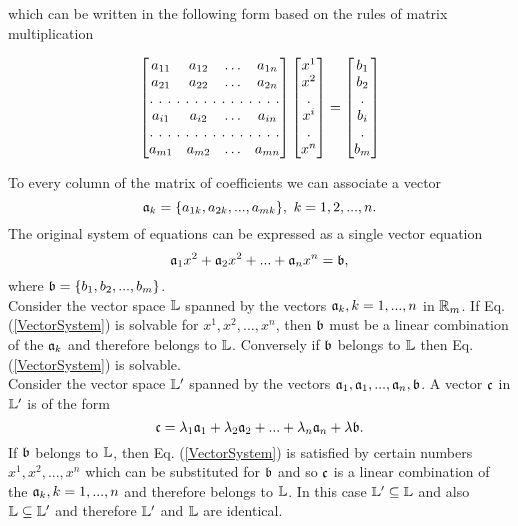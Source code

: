 which can be written in the following form based on the rules of matrix multiplication

\begin{equation}
\begin{bmatrix}
a_{11} & a_{12}  & \hdots & a_{1n}  \\
a_{21} & a_{22}  & \hdots & a_{2n}  \\
\hdotsfor[2]{4}\\
a_{i1} & a_{i2}  & \hdots & a_{in}  \\
\hdotsfor[2]{4}\\
a_{m1} & a_{m2}  & \hdots & a_{mn}  \\
\end{bmatrix}
\begin{bmatrix}
x^1\\
x^2\\
.\\
x^i\\
.\\
x^n\\
\end{bmatrix}
=
\begin{bmatrix}
b_1\\
b_2\\
.\\
b_i\\
.\\
b_m\\
\end{bmatrix}
\label{MatrixSystem}
\end{equation}

To every column of the matrix of coefficients we can associate a vector
$$\mathfrak{a}_k = \{a_{1k}, a_{2k},...,a_{mk}\}, ~k = 1,2,...,n.$$
The original system of equations can be expressed as a single vector equation
\begin{equation}\mathfrak{a}_1 x^2 + \mathfrak{a}_2 x^2 + ... + \mathfrak{a}_n x^n = \mathfrak{b},\label{VectorSystem}\end{equation} where $\mathfrak{b} = \{b_1, b_2, ..., b_m\}$. \\

Consider the vector space $\mathbb{L}$ spanned by the vectors $\mathfrak{a}_k, k = 1,...,n$ in $\mathbb{R}_m$. If Eq.(\ref{VectorSystem}) is solvable for $x^1, x^2, ..., x^n$, then $\mathfrak{b}$ must be a linear combination of the $\mathfrak{a}_k$ and therefore belongs to $\mathbb{L}$. Conversely if $\mathfrak{b}$ belongs to $\mathbb{L}$ then Eq.(\ref{VectorSystem}) is solvable. \\

Consider the vector space $\mathbb{L}'$ spanned by the vectors $\mathfrak{a}_1, \mathfrak{a}_1, ..., \mathfrak{a}_n, \mathfrak{b}$. A vector $\mathfrak{c}$ in $\mathbb{L}'$ is of the form 
$$\mathfrak{c} = \lambda_1 \mathfrak{a}_1 + \lambda_2 \mathfrak{a}_2 + ... + \lambda_n \mathfrak{a}_n + \lambda \mathfrak{b}.$$ If $\mathfrak{b}$ belongs to $\mathbb{L}$, then Eq. (\ref{VectorSystem}) is satisfied by certain numbers $x^1, x^2, ..., x^n$ which can be substituted for 
$\mathfrak{b}$ and so $\mathfrak{c}$ is a linear combination of the $\mathfrak{a}_k, k = 1,..., n$ and therefore belongs to $\mathbb{L}$. In this case $\mathbb{L}' \subseteq \mathbb{L}$ and also $\mathbb{L} \subseteq \mathbb{L}'$ and therefore $\mathbb{L}'$ and $\mathbb{L}$ are identical. 

